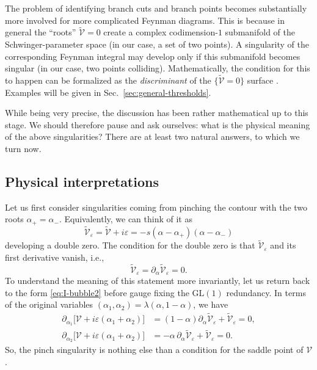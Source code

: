 \documentclass[12pt]{article}
\numberwithin{figure}{section}
\def \be {\begin{equation}}
\def \ee {\end{equation}}
\def \eps {\varepsilon}
\def \V {\mathcal{V}}
\def \GL {\mathrm{GL}}
\begin{document}
	The problem of identifying branch cuts and branch points becomes substantially more involved for more complicated Feynman diagrams. This is because in general the ``roots'' $\tilde{\V}=0$ create a complex codimension-$1$ submanifold of the Schwinger-parameter space (in our case, a set of two points). A singularity of the corresponding Feynman integral may develop only if this submanifold becomes singular (in our case, two points colliding). Mathematically, the condition for this to happen can be formalized as the \emph{discriminant} of the $\{\tilde{\V}=0\}$ surface \cite{Mizera:2021icv}. Examples will be given in Sec.~\ref{sec:general-thresholds}.
	
	While being very precise, the discussion has been rather mathematical up to this stage. We should therefore pause and ask ourselves: what is the physical meaning of the above singularities? There are at least two natural answers, to which we turn now.
	
	\subsection{\label{sec:interpretation}Physical interpretations}
	
	Let us first consider singularities coming from pinching the contour with the two roots $\alpha_+ = \alpha_-$. Equivalently, we can think of it as
	\be
	\tilde{\V}_\eps =
	\tilde{\V}+i\eps = -s(\alpha - \alpha_+)(\alpha - \alpha_-)
	\ee
	developing a double zero. The condition for the double zero is that $\tilde{\V}_\eps$ and its first derivative vanish, i.e.,
	\be
	\tilde{\V}_\eps = \partial_{\alpha} \tilde{\V}_\eps = 0.
	\ee
	To understand the meaning of this statement more invariantly, let us return back to the form \eqref{eq:I-bubble2} before gauge fixing the $\GL(1)$ redundancy. In terms of the original variables $(
	\alpha_1, \alpha_2) = \lambda(\alpha, 1{-}\alpha)$, we have 
	\begin{align}
		\partial_{\alpha_1}\big[\V {+} i\eps(\alpha_1 {+} \alpha_2)\big] &= (1{-}\alpha) \partial_{\alpha} \tilde{\V}_\eps + \tilde{\V}_\eps = 0,\\
		\partial_{\alpha_2}\big[\V {+} i\eps(\alpha_1 {+} \alpha_2)\big] &= -\alpha\, \partial_{\alpha} \tilde{\V}_\eps + \tilde{\V}_\eps = 0.
	\end{align}
	So, the pinch singularity is nothing else than a condition for the saddle point of $\V$.
	
\end{document}
